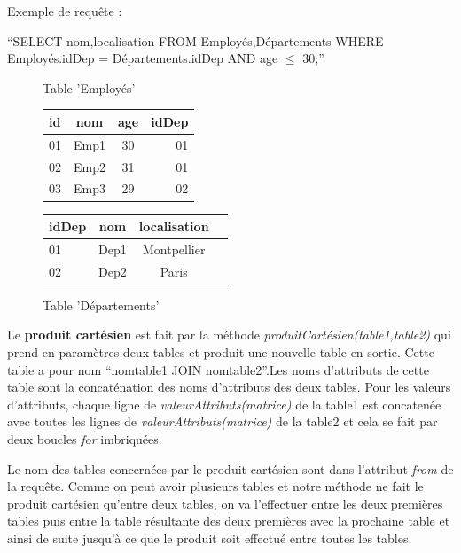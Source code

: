 \documentclass[oneside,13pt,a4paper]{report}
\begin{document}
Exemple de requête :
\begin{center}
	\enquote{SELECT nom,localisation FROM Employés,Départements WHERE Employés.idDep = Départements.idDep AND age $\leq$ 30;}
	\begin{figure}[h]
		\begin{minipage}[c]{.46\linewidth}
			\centering
			\caption{Table 'Employés'}
			\begin{tabular}{|l|c|c|r|}
				\hline
				id & nom  & age & idDep
				\\
				\hline
				01 & Emp1 & 30  & 01    \\
				02 & Emp2 & 31  & 01    \\
				03 & Emp3 & 29  & 02    \\
				\hline
			\end{tabular}
		\end{minipage}
		\hfill%
		\begin{minipage}[c]{.46\linewidth}
			\centering
			\caption{Table 'Départements'}
			\begin{tabular}{|l|c|c|r|}
				\hline
				idDep & nom  & localisation
				\\
				\hline
				01    & Dep1 & Montpellier  \\
				02    & Dep2 & Paris        \\
				\hline
			\end{tabular}
		\end{minipage}
	\end{figure}
\end{center}

Le \textbf{produit cartésien} est fait par la méthode \textit{produitCartésien(table1,table2)} qui prend en paramètres deux tables et produit une nouvelle table en sortie. Cette table a pour nom \enquote{nomtable1 JOIN nomtable2}.Les noms d'attributs de cette table sont la concaténation des noms d'attributs des deux tables. Pour les valeurs d'attributs, chaque ligne de \textit{valeurAttributs(matrice)} de la table1 est concatenée avec toutes les lignes de \textit{valeurAttributs(matrice)} de la table2 et cela se fait par deux boucles \textit{for} imbriquées.

Le nom des tables concernées par le produit cartésien sont dans l'attribut \textit{from} de la requête. Comme on peut avoir plusieurs tables et notre méthode ne fait le produit cartésien qu'entre deux tables, on va l'effectuer entre les deux premières tables puis entre la table résultante des deux premières avec la prochaine table et ainsi de suite jusqu'à ce que le produit soit effectué entre toutes les tables.
\end{document}
